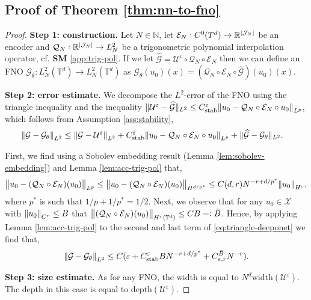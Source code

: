 \documentclass{article}
\numberwithin{equation}{section}
\newcommand{\width}{\mathrm{width}}
\newcommand{\depth}{\mathrm{depth}}
\newcommand{\T}{\mathbb{T}}
\newcommand{\R}{\mathbb{R}}
\newcommand{\N}{\mathbb{N}}
\newcommand{\cE}{\mathcal{E}}
\newcommand{\cG}{\mathcal{G}}
\newcommand{\cJ}{\mathcal{J}}
\newcommand{\cQ}{\mathcal{Q}}
\newcommand{\cU}{\mathcal{U}}
\newcommand{\cX}{\mathcal{X}}
\renewcommand{\epsilon}{\varepsilon}
\newcommand{\1}{\mathbbm{1}}
\newcommand{\cGhat}{{\widehat{\cG}}}
\newcommand{\bigO}{\mathcal{O}}
\begin{document}
\subsection{Proof of Theorem \ref{thm:nn-to-fno}}\label{app:nn-to-fno}

\begin{proof}
\textbf{Step 1: construction. }
Let $N\in\N$, let $\cE_N: C^0(T^d)\to \R^{\abs{\cJ_N}}$ be an encoder and $\cQ_N: \R^{\abs{\cJ_N}}\to L^2_N$ be a trigonometric polynomial interpolation operator, cf. \textbf{SM} \ref{app:trig-pol}. If we let $\cGhat = \cU^\epsilon \circ \cQ_N \circ \cE_N$ then we can define an FNO $\cG_\theta: L^2_N(\T^d)\to L^2_N(\T^d)$ as $\cG_\theta(u_0)(x) =  (\cQ_N\circ \cE_N \circ \cGhat)(u_0)(x)$. 

\textbf{Step 2: error estimate.}
We decompose the $L^2$-error of the FNO using the triangle inequality and the inequality $\Vert\cU^\epsilon-\cGhat\Vert_{L^2}\leq C^\epsilon_{\mathrm{stab}}\norm{u_0-\cQ_N\circ\cE_N\circ u_0}_{L^p}$, which follows from Assumption \ref{ass:stability},
\begin{align}\label{eq:triangle-deeponet}
\begin{split}
\norm{\cG-\cG_\theta}_{L^2}
&\leq \norm{\cG-\cU^\epsilon}_{L^2} + C^\epsilon_{\mathrm{stab}}\norm{u_0-\cQ_N\circ\cE_N\circ u_0}_{L^p}+ \Vert\cGhat-\cG_\theta\Vert_{L^2}.
\end{split}
\end{align}

First, we find using a Sobolev embedding result (Lemma \ref{lem:sobolev-embedding}) and Lemma \ref{lem:acc-trig-pol} that,
\begin{equation}\label{eq:QEu0}
     \norm{u_0-(\cQ_N\circ\cE_N)(u_0)}_{L^p}\leq  \norm{u_0-(\cQ_N\circ\cE_N)(u_0)}_{H^{d/p^*}} \leq C(d,r) N^{-r+d/p^*}\norm{u_0}_{H^{r}},
\end{equation}
where $p^*$ is such that $1/p+1/p^*=1/2$. Next, we observe that for any $u_0\in\cX$ with $\norm{u_0}_{C^r}\leq B$ that $\norm{(\cQ_N\circ\cE_N)(u_0)}_{H^r(\T^d)} \leq C B=:\Bar{B}$. Hence, by applying Lemma \ref{lem:acc-trig-pol} to the second and last term of \eqref{eq:triangle-deeponet} we find that,
\begin{equation}
    \norm{\cG-\cG_\theta}_{L^2}
\leq C(\epsilon + C^\epsilon_{\mathrm{stab}}BN^{-r+d/p^*}+ C_{\epsilon,r}^{\Bar{B}}N^{-r}).
\end{equation}

\textbf{Step 3: size estimate. }
As for any FNO, the width is equal to $N^d\width(\cU^\epsilon)$. The depth in this case is equal to $\depth(\cU^\epsilon)$. 


\end{proof}
\end{document}
